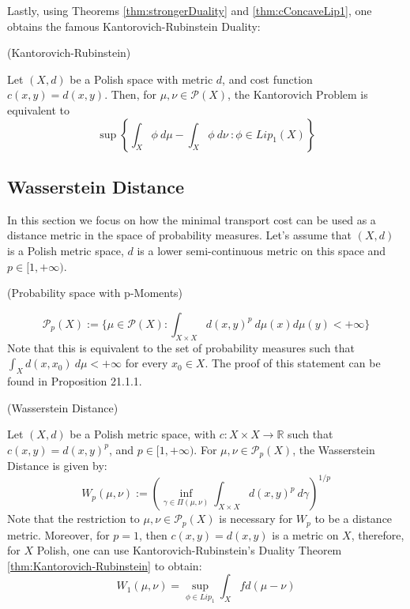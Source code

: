 Lastly, using  Theorems
\ref{thm:strongerDuality} and \ref{thm:cConcaveLip1}, one obtains the famous
Kantorovich-Rubinstein Duality:

\begin{theorem}(Kantorovich-Rubinstein)

  Let $(X,d)$ be a Polish space with metric $d$, and cost function $c(x,y) = d(x,y)$.
  Then, for $\mu, \nu \in \mathcal P(X)$, the Kantorovich Problem
  is equivalent to
  \begin{equation}
      \sup \left \{
      \int_X \phi \ d\mu - \int_X \phi \ d\nu \ :
      \phi \in Lip_1(X)
      \right \}
  \end{equation}
  \label{thm:Kantorovich-Rubinstein}
\end{theorem}

\subsection{Wasserstein Distance}

In this section we focus on how the minimal transport cost can be used as a distance metric
in the space of probability measures. Let's assume that $(X,d)$ is a Polish metric space,
$d$ is a lower semi-continuous metric on this space and $ p \in [1,+\infty)$.

\begin{definition}(Probability space with p-Moments)

  \begin{equation}
    \mathcal P_p(X) := \{
         \mu \in \mathcal P(X): \int_{X \times X} d(x,y)^p \ d \mu(x) d \mu(y) < +\infty
      \}
  \label{eq:Pp}
  \end{equation}
  Note that this is equivalent to the set of probability measures such that $\int_X d(x,x_0) \ d\mu<+\infty$
  for every $x_0 \in X$. The proof of this statement can be found
  in \citet{garling2018analysis} Proposition 21.1.1.
\end{definition}

\begin{definition}(Wasserstein Distance)

  Let $(X,d)$ be a Polish metric space, with $c:X \times X \to \mathbb R$ such that $c(x,y)=d(x,y)^p$, and
  $p \in [1,+\infty)$.
  For $\mu,\nu \in \mathcal P_p(X)$, the Wasserstein Distance is given by:
  \begin{equation}
    W_p(\mu,\nu) :=
    \left(
    \inf_{\gamma \in \Pi(\mu,\nu)}
    \int_{X \times X} d(x,y)^p \ d\gamma
    \right)^{1/p}
    \label{def:Wasserstein}
  \end{equation}
  Note that the restriction to $\mu,\nu \in \mathcal P_p(X)$ is necessary for $W_p$ to be a distance metric.
  Moreover, for $p=1$, then $c(x,y) = d(x,y)$ is a metric on $X$, therefore, for $X$ Polish, one can
  use Kantorovich-Rubinstein's Duality Theorem \ref{thm:Kantorovich-Rubinstein} to obtain:
  \begin{equation}
    W_1(\mu,\nu) =
    \sup_{\phi \in Lip_1} \int_X f d (\mu - \nu)
  \end{equation}
\end{definition}

